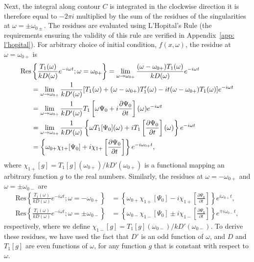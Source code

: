 \documentclass[12pt]{../style-files/ociamthesis}
\begin{document}
Next, the integral along contour $C$ is integrated in the clockwise direction it is therefore equal to $-2\pi i$ multiplied by the sum of the residues of the singularities at $\omega = \pm \omega_{0\pm}$. The residues are evaluated using L'Hopital's Rule (the requirements ensuring the validity of this rule are verified in Appendix~\ref{app: l'hopital}). For arbitrary choice of initial condition, $f(x,\omega)$, the residue at $\omega = \omega_{0+}$ is
\begin{align}
\mathrm{Res}&\left\{\frac{T_1(\omega)}{kD(\omega)}e^{-i\omega t}; \omega = \omega_{0+} \right\} = 
\lim_{\omega \to \omega_{0+}} \frac{(\omega - \omega_{0+})T_1(\omega)}{kD(\omega)} e^{-i\omega t} \notag \\ 
&= \lim_{\omega \to \omega_{0+}} \frac{1}{kD'(\omega)} [T_1(\omega) + (\omega - \omega_{0+})T'_1(\omega) - it(\omega - \omega_{0+})T_1(\omega)]e^{-i\omega t} \notag \\
&= \lim_{\omega \to \omega_{0+}} \frac{1}{kD'(\omega)} T_1\left[\omega \Psi_0 + i\frac{\partial \Psi_0}{\partial t}\right](\omega) e^{-i\omega t} \notag \\
&= \lim_{\omega \to \omega_{0+}} \frac{1}{kD'(\omega)} \left\{ \omega T_1[\Psi_0](\omega) + iT_1\left[\frac{\partial \Psi_0}{\partial t}\right](\omega) \right\} e^{-i\omega t} \notag \\
&= \left\{ \omega_{0+} \chi_{1+}[\Psi_0] + i\chi_{1+}\left[\frac{\partial \Psi_0}{\partial t}\right] \right\} e^{-i\omega_{0+} t},
\end{align}
where $\chi_{1+}[g] = T_1[g](\omega_{0+}) / kD'(\omega_{0+})$ is a functional mapping an arbitrary function $g$ to the real numbers. Similarly, the residues at $\omega = -\omega_{0+}$ and $\omega = \pm\omega_{0-}$ are
\begin{align}
\mathrm{Res}\left\{\frac{T_1(\omega)}{kD(\omega)}e^{-i\omega t}; \omega = -\omega_{0+} \right\} &= \left\{ \omega_{0+} \chi_{1+}[\Psi_0] - i\chi_{1+}\left[\frac{\partial \Psi_0}{\partial t}\right] \right\} e^{i\omega_{0+} t}, \\
\mathrm{Res}\left\{\frac{T_1(\omega)}{kD(\omega)}e^{-i\omega t}; \omega = \pm \omega_{0-} \right\} &= \left\{ \omega_{0-} \chi_{1-}[\Psi_0] \pm i\chi_{1-}\left[\frac{\partial \Psi_0}{\partial t}\right] \right\} e^{\mp i\omega_{0-} t},
\end{align}
respectively, where we define $\chi_{1-}[g] = T_1[g](\omega_{0-}) / kD'(\omega_{0-})$. To derive these residues, we have used the fact that $D'$ is an odd function of $\omega$, and $D$ and $T_1[g]$ are even functions of $\omega$, for any function $g$ that is constant with respect to $\omega$.
\end{document}
